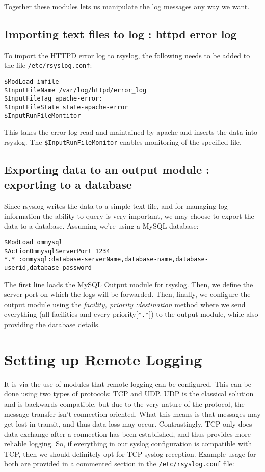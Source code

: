 \noindent
Together these modules lets us manipulate the log messages any way we want. 

\subsection{Importing text files to log : httpd error log}
To import the HTTPD error log to rsyslog, the following needs to be added to the file \verb|/etc/rsyslog.conf|:

\vspace{-15pt}
\begin{verbatim}
$ModLoad imfile
$InputFileName /var/log/httpd/error_log
$InputFileTag apache-error:
$InputFileState state-apache-error
$InputRunFileMontitor
\end{verbatim}
\vspace{-10pt}	

\noindent
This takes the error log read and maintained by apache and inserts the data into rsyslog. The \verb|$InputRunFileMonitor| enables monitoring of the specified file. 

\subsection{Exporting data to an output module : exporting to a database}
Since rsyslog writes the data to a simple text file, and for managing log information the ability to query is very important, we may choose to export the data to a database. Assuming we're using a MySQL database:

\vspace{-15pt}
\begin{verbatim}
$ModLoad ommysql
$ActionOmmysqlServerPort 1234
*.* :ommysql:database-serverName,database-name,database-userid,database-password
\end{verbatim}
\vspace{-10pt}	

\noindent
The first line loads the MySQL Output module for rsyslog. Then, we define the server port on which the logs will be forwarded. Then, finally, we configure the output module using the \textit{facility, priority :destination} method where we send everything (all facilities and every priority[\verb|*.*|]) to the output module, while also providing the database details. 

	\section{Setting up Remote Logging}
It is via the use of modules that remote logging can be configured. This can be done using two types of protocols: TCP and UDP. UDP is the classical solution and is backwards compatible, but due to the very nature of the protocol, the message transfer isn't connection oriented. What this means is that messages may get lost in transit, and thus data loss may occur. Contrastingly, TCP only does data exchange after a connection has been established, and thus provides more reliable logging. So, if everything in our syslog configuration is compatible with TCP, then we should definitely opt for TCP syslog reception. Example usage for both are provided in a commented section in the \verb|/etc/rsyslog.conf| file:

